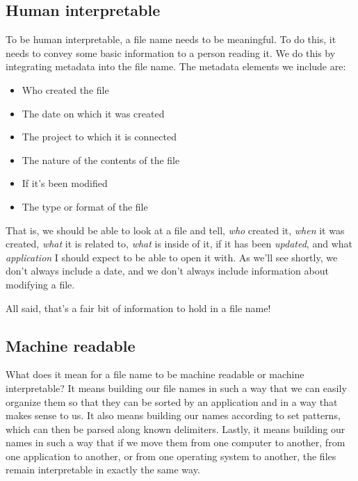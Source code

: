 \documentclass[
]{book}
\providecommand{\tightlist}{%
  \setlength{\itemsep}{0pt}\setlength{\parskip}{0pt}}
\begin{document}
\hypertarget{human-interpretable}{%
\subsection*{Human interpretable}\label{human-interpretable}}

To be human interpretable, a file name needs to be meaningful. To do this, it needs to convey some basic information to a person reading it. We do this by integrating metadata into the file name. The metadata elements we include are:

\begin{itemize}
\tightlist
\item
  Who created the file
\item
  The date on which it was created
\item
  The project to which it is connected
\item
  The nature of the contents of the file
\item
  If it's been modified
\item
  The type or format of the file
\end{itemize}

That is, we should be able to look at a file and tell, \emph{who} created it, \emph{when} it was created, \emph{what} it is related to, \emph{what} is inside of it, if it has been \emph{updated}, and what \emph{application} I should expect to be able to open it with. As we'll see shortly, we don't always include a date, and we don't always include information about modifying a file.

All said, that's a fair bit of information to hold in a file name!

\hypertarget{machine-readable}{%
\subsection*{Machine readable}\label{machine-readable}}

What does it mean for a file name to be machine readable or machine interpretable? It means building our file names in such a way that we can easily organize them so that they can be sorted by an application and in a way that makes sense to us. It also means building our names according to set patterns, which can then be parsed along known delimiters. Lastly, it means building our names in such a way that if we move them from one computer to another, from one application to another, or from one operating system to another, the files remain interpretable in exactly the same way.
\end{document}
